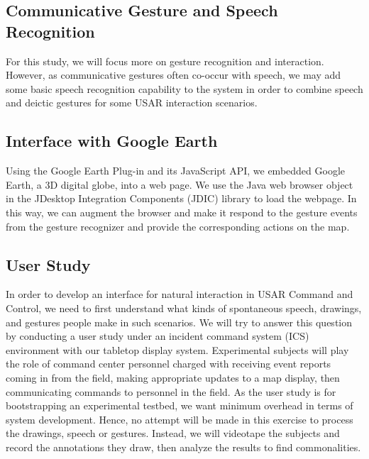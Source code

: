 \subsection{Communicative Gesture and Speech Recognition} 
For this study, we will focus more on gesture recognition and interaction. However, as communicative gestures often co-occur with speech, we may add some basic speech recognition capability to the system in order to combine speech and deictic gestures for some USAR interaction scenarios.

\subsection{Interface with Google Earth}
Using the Google Earth Plug-in and its JavaScript API,  we embedded Google Earth, a 3D digital globe, into a web page. We use the Java web browser object in the JDesktop Integration Components (JDIC) library to load the webpage. In this way, we can augment the browser and make it respond to the gesture events from the gesture recognizer and provide the corresponding actions on the map. 

\subsection{User Study}\label{sec:userStudy}
In order to develop an interface for natural interaction in USAR Command and Control, we need to first understand what kinds of spontaneous speech, drawings, and gestures people make in such scenarios. We will try to answer this question by conducting a user study under an incident command system (ICS) environment with our tabletop display system. Experimental subjects will play the role of command center personnel charged with receiving event reports coming in from the field, making appropriate updates to a map display, then communicating commands to personnel in the field. As the user study is for bootstrapping an experimental testbed, we want minimum overhead in terms of system development. Hence, no attempt will be made in this exercise to process the drawings, speech or gestures. Instead, we will videotape the subjects and record the annotations they draw, then analyze the results to find commonalities. 

